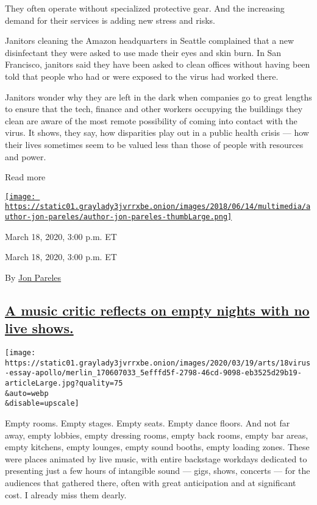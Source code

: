 They often operate without specialized protective gear. And the
increasing demand for their services is adding new stress and risks.

Janitors cleaning the Amazon headquarters in Seattle complained that a
new disinfectant they were asked to use made their eyes and skin burn.
In San Francisco, janitors said they have been asked to clean offices
without having been told that people who had or were exposed to the
virus had worked there.

Janitors wonder why they are left in the dark when companies go to great
lengths to ensure that the tech, finance and other workers occupying the
buildings they clean are aware of the most remote possibility of coming
into contact with the virus. It shows, they say, how disparities play
out in a public health crisis --- how their lives sometimes seem to be
valued less than those of people with resources and power.

Read more

\href{https://www.nytimes3xbfgragh.onion/by/jon-pareles}{\texttt{[image: https://static01.graylady3jvrrxbe.onion/images/2018/06/14/multimedia/author-jon-pareles/author-jon-pareles-thumbLarge.png]}}

March 18, 2020, 3:00 p.m. ET

March 18, 2020, 3:00 p.m. ET

By \href{https://www.nytimes3xbfgragh.onion/by/jon-pareles}{Jon Pareles}

\hypertarget{a-music-critic-reflects-on-empty-nights-with-no-live-shows}{%
\subsection{\texorpdfstring{\protect\hyperlink{a-music-critic-reflects-on-empty-nights-with-no-live-shows}{A
music critic reflects on empty nights with no live
shows.}}{A music critic reflects on empty nights with no live shows.}}\label{a-music-critic-reflects-on-empty-nights-with-no-live-shows}}

\texttt{[image: https://static01.graylady3jvrrxbe.onion/images/2020/03/19/arts/18virus-essay-apollo/merlin\_170607033\_5efffd5f-2798-46cd-9098-eb3525d29b19-articleLarge.jpg?quality=75\\\&auto=webp\\\&disable=upscale]}

Empty rooms. Empty stages. Empty seats. Empty dance floors. And not far
away, empty lobbies, empty dressing rooms, empty back rooms, empty bar
areas, empty kitchens, empty lounges, empty sound booths, empty loading
zones. These were places animated by live music, with entire backstage
workdays dedicated to presenting just a few hours of intangible sound
--- gigs, shows, concerts --- for the audiences that gathered there,
often with great anticipation and at significant cost. I already miss
them dearly.

